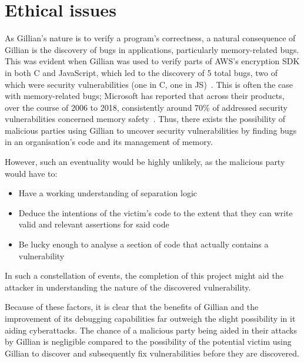 
\chapter{Ethical issues}
\label{cha:ethics}

As Gillian's nature is to verify a program's correctness, a natural consequence of Gillian is the discovery of bugs in applications, particularly memory-related bugs.
This was evident when Gillian was used to verify parts of AWS's encryption SDK in both C and JavaScript, which led to the discovery of 5 total bugs, two of which were security vulnerabilities (one in C, one in JS)~\cite{gillian-part2}.
This is often the case with memory-related bugs; Microsoft has reported that across their products, over the course of 2006 to 2018, consistently around 70\% of addressed security vulnerabilities concerned memory safety~\cite{microsoft-memory-bugs}.
Thus, there exists the possibility of malicious parties using Gillian to uncover security vulnerabilities by finding bugs in an organisation's code and its management of memory.

However, such an eventuality would be highly unlikely, as the malicious party would have to:
\begin{itemize}
  \item Have a working understanding of separation logic
  \item Deduce the intentions of the victim's code to the extent that they can write valid and relevant assertions for said code
  \item Be lucky enough to analyse a section of code that actually contains a vulnerability
\end{itemize}

In such a constellation of events, the completion of this project might aid the attacker in understanding the nature of the discovered vulnerability.

Because of these factors, it is clear that the benefits of Gillian and the improvement of its debugging capabilities far outweigh the slight possibility in it aiding cyberattacks.
The chance of a malicious party being aided in their attacks by Gillian is negligible compared to the possibility of the potential victim using Gillian to discover and subsequently fix vulnerabilities before they are discovered.

